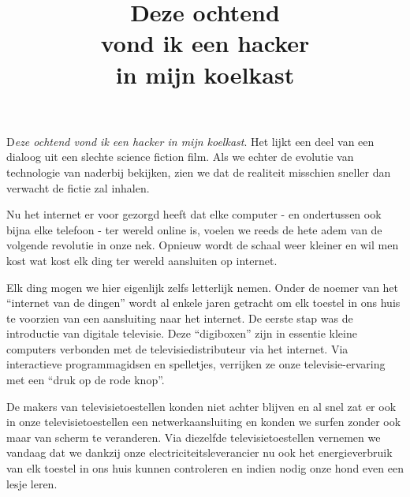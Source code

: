 \documentclass[DIV=calc,paper=a4,fontsize=11pt,twocolumn,draft]{scrartcl}
\title{Deze ochtend\\vond ik een hacker\\in mijn koelkast}
\date{}
\newcommand{\initial}[1]{
\lettrine[lines=4,lhang=0.3,nindent=0em]{
\color{VeryDarkGrey}
{\textsf{#1}}}{}}
\begin{document}

\initial{D}\emph{eze ochtend vond ik een hacker in mijn koelkast}. Het lijkt
een deel van een dialoog uit een slechte science fiction film. Als we echter de
evolutie van technologie van naderbij bekijken, zien we dat de realiteit
misschien sneller dan verwacht de fictie zal inhalen.

Nu het internet er voor gezorgd heeft dat elke computer - en ondertussen ook
bijna elke telefoon - ter wereld online is, voelen we reeds de hete adem van de
volgende revolutie in onze nek. Opnieuw wordt de schaal weer kleiner en wil men
kost wat kost elk ding ter wereld aansluiten op internet.

Elk ding mogen we hier eigenlijk zelfs letterlijk nemen. Onder de noemer van
het ``internet van de dingen'' wordt al enkele jaren getracht om elk toestel in
ons huis te voorzien van een aansluiting naar het internet. De eerste stap was
de introductie van digitale televisie. Deze ``digiboxen'' zijn in essentie
kleine computers verbonden met de televisiedistributeur via het internet. Via
interactieve programmagidsen en spelletjes, verrijken ze onze
televisie-ervaring met een ``druk op de rode knop''.

De makers van televisietoestellen konden niet achter blijven en al snel zat er
ook in onze televisietoestellen een netwerkaansluiting en konden we surfen
zonder ook maar van scherm te veranderen. Via diezelfde televisietoestellen
vernemen we vandaag dat we dankzij onze electriciteitsleverancier nu ook het
energieverbruik van elk toestel in ons huis kunnen controleren en indien nodig
onze hond even een lesje leren.
\end{document}
